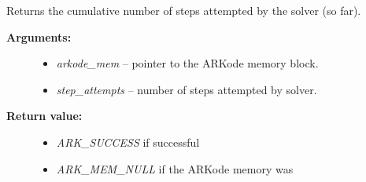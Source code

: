 \documentclass[letterpaper,10pt,english]{sphinxmanual}
\begin{document}
\begin{fulllineitems}
\label{c_interface/User_callable:c.ARKodeGetNumStepAttempts}
Returns the cumulative number of steps attempted by the solver (so far).
\begin{description}
\item[{\textbf{Arguments:}}] \leavevmode\begin{itemize}
\item {} 
\emph{arkode\_mem} -- pointer to the ARKode memory block.

\item {} 
\emph{step\_attempts} -- number of steps attempted by solver.

\end{itemize}

\item[{\textbf{Return value:}}] \leavevmode\begin{itemize}
\item {} 
\emph{ARK\_SUCCESS} if successful

\item {} 
\emph{ARK\_MEM\_NULL} if the ARKode memory was 

\end{itemize}

\end{description}

\end{fulllineitems}

\end{document}
